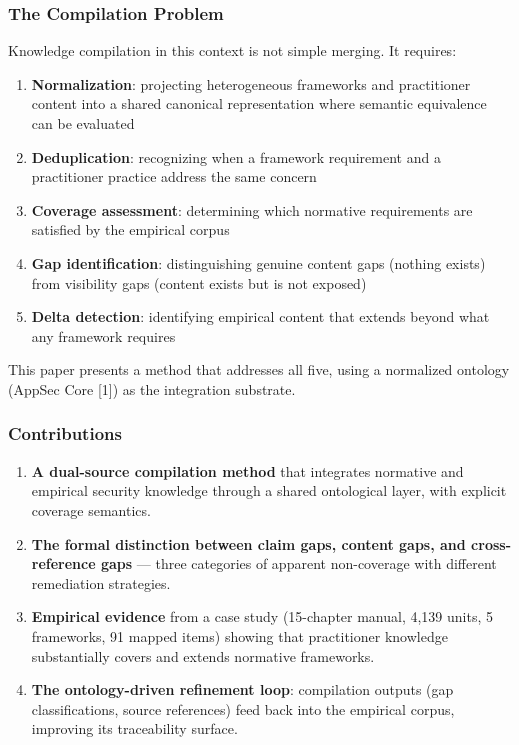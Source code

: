 \documentclass[
]{article}
\providecommand{\tightlist}{%
  \setlength{\itemsep}{0pt}\setlength{\parskip}{0pt}}
\begin{document}
\subsubsection{The Compilation Problem}\label{the-compilation-problem}

Knowledge compilation in this context is not simple merging. It
requires:

\begin{enumerate}
\def\labelenumi{\arabic{enumi}.}
\tightlist
\item
  \textbf{Normalization}: projecting heterogeneous frameworks and
  practitioner content into a shared canonical representation where
  semantic equivalence can be evaluated
\item
  \textbf{Deduplication}: recognizing when a framework requirement and a
  practitioner practice address the same concern
\item
  \textbf{Coverage assessment}: determining which normative requirements
  are satisfied by the empirical corpus
\item
  \textbf{Gap identification}: distinguishing genuine content gaps
  (nothing exists) from visibility gaps (content exists but is not
  exposed)
\item
  \textbf{Delta detection}: identifying empirical content that extends
  beyond what any framework requires
\end{enumerate}

This paper presents a method that addresses all five, using a normalized
ontology (AppSec Core {[}1{]}) as the integration substrate.

\subsubsection{Contributions}\label{contributions}

\begin{enumerate}
\def\labelenumi{\arabic{enumi}.}
\item
  \textbf{A dual-source compilation method} that integrates normative
  and empirical security knowledge through a shared ontological layer,
  with explicit coverage semantics.
\item
  \textbf{The formal distinction between claim gaps, content gaps, and
  cross-reference gaps} --- three categories of apparent non-coverage
  with different remediation strategies.
\item
  \textbf{Empirical evidence} from a case study (15-chapter manual,
  4,139 units, 5 frameworks, 91 mapped items) showing that practitioner
  knowledge substantially covers and extends normative frameworks.
\item
  \textbf{The ontology-driven refinement loop}: compilation outputs (gap
  classifications, source references) feed back into the empirical
  corpus, improving its traceability surface.
\end{enumerate}
\end{document}

